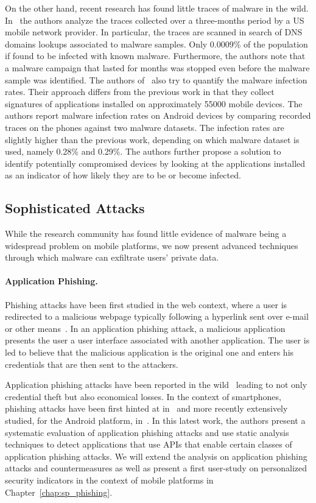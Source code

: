 On the other hand, recent research has found little traces of malware in the wild. In~\cite{lever-ndss13} the authors analyze the traces collected over a three-months period by a US mobile network provider. In particular, the traces are scanned in search of DNS domains lookups associated to malware samples. Only 0.0009\% of the population if found to be infected with known malware. Furthermore, the authors note that a malware campaign that lasted for months was stopped even before the malware sample was identified. The authors of~\cite{truong13} also try to quantify the malware infection rates. Their approach differs from the previous work in that they collect signatures of applications installed on approximately 55000 mobile devices. The authors report malware infection rates on Android devices by comparing recorded traces on the phones against two malware datasets. The infection rates are slightly higher than the previous work, depending on which malware dataset is used, namely 0.28\% and 0.29\%. The authors further propose a solution to identify potentially compromised devices by looking at the applications installed as an indicator of how likely they are to be or become infected.

\subsection{Sophisticated Attacks}

While the research community has found little evidence of malware being a widespread problem on mobile platforms, we now present advanced techniques through which malware can exfiltrate users' private data.

\paragraph{Application Phishing.}
Phishing attacks have been first studied in the web context, where a user is redirected to a malicious webpage typically following a hyperlink sent over e-mail or other means~\cite{dhamija06chi,Fette2007,Garera2007}. In an application phishing attack, a malicious application presents the user a user interface associated with another application. The user is led to believe that the malicious application is the original one and enters his credentials that are then sent to the attackers. 

Application phishing attacks have been reported in the wild~\cite{droid09, digitaltrends, securelist,macrumors,forbes} leading to not only credential theft but also economical losses. In the context of smartphones, phishing attacks have been first hinted at in~\cite{chin11mobisys, zu-woot12, felt11w2sp} and more recently extensively studied, for the Android platform, in~\cite{bianchi15sp}. In this latest work, the authors present a systematic evaluation of application phishing attacks and use static analysis techniques to detect applications that use APIs that enable certain classes of application phishing attacks. We will extend the analysis on application phishing attacks and countermeasures as well as present a first user-study on personalized security indicators in the context of mobile platforms in Chapter~\ref{chap:sp_phishing}.

